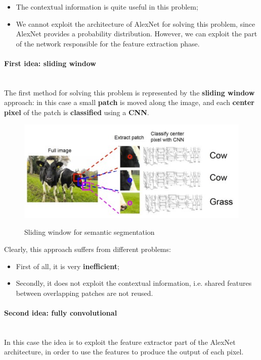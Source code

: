 \begin{itemize}
    \item The contextual information is quite useful in this problem;
    \item We cannot exploit the architecture of AlexNet for solving this problem, since AlexNet provides a probability distribution. However, we can exploit the part of the network responsible for the feature extraction phase.
\end{itemize}

\paragraph{First idea: sliding window}
\\
The first method for solving this problem is represented by the \textbf{sliding window} approach: in this case a small \textbf{patch} is moved along the image, and each \textbf{center pixel} of the patch is \textbf{classified} using a \textbf{CNN}. 

\begin{figure}[h!]
		\centering
        \includegraphics[scale = 2.0]{img/semantic1.jpg}
		\label{semantic1}
        \caption{Sliding window for semantic segmentation}
\end{figure}

Clearly, this approach suffers from different problems:

\begin{itemize}
    \item First of all, it is very \textbf{inefficient};
    \item Secondly, it does not exploit the contextual information, i.e. shared features between overlapping patches are not reused.
\end{itemize}

\paragraph{Second idea: fully convolutional}
\\
In this case the idea is to exploit the feature extractor part of the AlexNet architecture, in order to use the features to produce the output of each pixel. 

